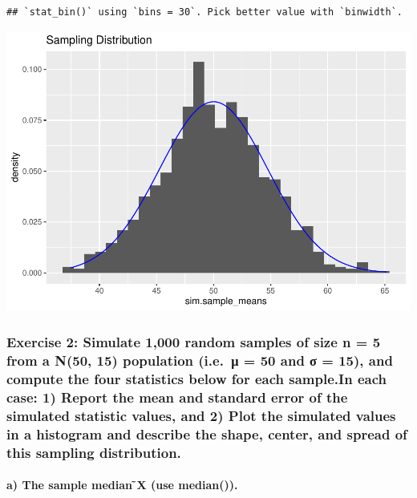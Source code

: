 \documentclass[
]{article}
\begin{document}
\begin{verbatim}
## `stat_bin()` using `bins = 30`. Pick better value with `binwidth`.
\end{verbatim}

\includegraphics{Class_Exercises_ClassNotes_5_files/figure-latex/unnamed-chunk-4-1.pdf}
\newpage

\hypertarget{exercise-2-simulate-1000-random-samples-of-size-n-5-from-a-n50-15-population-i.e.-ux3bc-50-and-ux3c3-15-and-compute-the-four-statistics-below-for-each-sample.in-each-case-1-report-the-mean-and-standard-error-of-the-simulated-statistic-values-and-2-plot-the-simulated-values-in-a-histogram-and-describe-the-shape-center-and-spread-of-this-sampling-distribution.}{%
\subsubsection{Exercise 2: Simulate 1,000 random samples of size n = 5
from a N(50, 15) population (i.e.~μ = 50 and σ = 15), and compute the
four statistics below for each sample.In each case: 1) Report the mean
and standard error of the simulated statistic values, and 2) Plot the
simulated values in a histogram and describe the shape, center, and
spread of this sampling
distribution.}\label{exercise-2-simulate-1000-random-samples-of-size-n-5-from-a-n50-15-population-i.e.-ux3bc-50-and-ux3c3-15-and-compute-the-four-statistics-below-for-each-sample.in-each-case-1-report-the-mean-and-standard-error-of-the-simulated-statistic-values-and-2-plot-the-simulated-values-in-a-histogram-and-describe-the-shape-center-and-spread-of-this-sampling-distribution.}}

\hypertarget{a-the-sample-median-x-use-median.}{%
\paragraph{a) The sample median ̃X (use
median()).}\label{a-the-sample-median-x-use-median.}}
\end{document}
